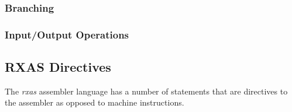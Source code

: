 \subsubsection{Branching}

\subsubsection{Input/Output Operations}

\subsection{RXAS Directives}

The \emph{rxas} assembler language has a number of statements that are
directives to the assembler as opposed to machine instructions.

